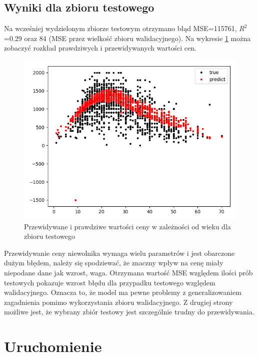 \documentclass[a4paper,12pt]{article}
\begin{document}
	\subsection{Wyniki dla zbioru testowego}
		Na wcześniej wydzielonym zbiorze testowym otrzymano błąd MSE=115761, $R^2$=0.29 oraz 84 (MSE przez wielkość zbioru walidacyjnego). Na wykresie \ref{test_predict} można zobaczyć rozkład prawdziwych i przewidywanych wartości cen.
		\begin{figure}[h]
			\centering
			\includegraphics[scale=0.6]{obrazy/test_predict.png} 
			\caption{Przewidywane i prawdziwe wartości ceny w zależności od wieku dla zbioru testowego}
			\label{test_predict}
		\end{figure}	
		Przewidywanie ceny niewolnika wymaga wielu parametrów i jest obarczone dużym błędem, należy się spodziewać, że znaczny wpływ na cenę miały niepodane dane jak wzrost, waga. Otrzymana wartość MSE względem ilości prób testowych pokazuje wzrost błędu dla przypadku testowego względem walidacyjnego. Oznacza to, że model ma pewne problemy z generalizowaniem zagadnienia pomimo wykorzystania zbioru walidacyjnego. Z drugiej strony możliwe jest, że wybrany zbiór testowy jest szczególnie trudny do przewidywania.
		
\section{Uruchomienie}
\end{document}
